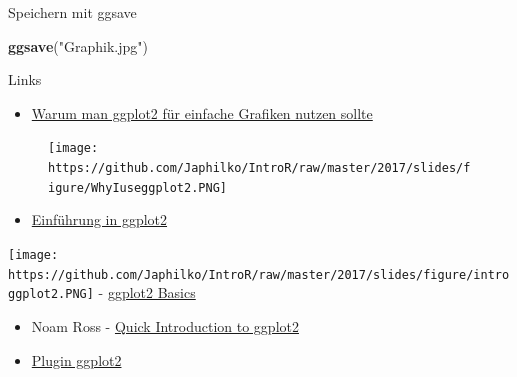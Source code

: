 \documentclass[ignorenonframetext,]{beamer}
\newenvironment{Shaded}{}{}
\newcommand{\KeywordTok}[1]{\textcolor[rgb]{0.00,0.44,0.13}{\textbf{{#1}}}}
\newcommand{\StringTok}[1]{\textcolor[rgb]{0.25,0.44,0.63}{{#1}}}
\newcommand{\NormalTok}[1]{{#1}}
\providecommand{\tightlist}{%
\setlength{\itemsep}{0pt}\setlength{\parskip}{0pt}}
\begin{document}
\begin{frame}[fragile]{Speichern mit ggsave}

\begin{Shaded}
\begin{Highlighting}[]
\KeywordTok{ggsave}\NormalTok{(}\StringTok{"Graphik.jpg"}\NormalTok{)}
\end{Highlighting}
\end{Shaded}

\end{frame}

\begin{frame}{Links}

\begin{itemize}
\tightlist
\item
  \href{http://www.r-bloggers.com/why-i-use-ggplot2/}{Warum man ggplot2
  für einfache Grafiken nutzen sollte}
\end{itemize}

\begin{figure}[htbp]
\centering
\texttt{[image: https://github.com/Japhilko/IntroR/raw/master/2017/slides/figure/WhyIuseggplot2.PNG]}
\caption{}
\end{figure}

\begin{itemize}
\tightlist
\item
  \href{https://opr.princeton.edu/workshops/Downloads/2015Jan_ggplot2Koffman.pdf}{Einführung
  in ggplot2}
\end{itemize}

\texttt{[image: https://github.com/Japhilko/IntroR/raw/master/2017/slides/figure/introggplot2.PNG]}
-
\href{http://tutorials.iq.harvard.edu/R/Rgraphics/Rgraphics.html}{ggplot2
Basics}

\begin{itemize}
\item
  Noam Ross -
  \href{http://www.noamross.net/blog/2012/10/5/ggplot-introduction.html}{Quick
  Introduction to ggplot2}
\item
  \href{https://www.r-bloggers.com/rcmdrplugin-kmggplot2_0-2-4-is-on-cran/}{Plugin
  ggplot2}
\end{itemize}

\end{frame}
\end{document}
